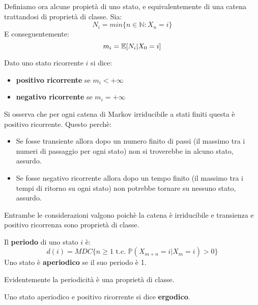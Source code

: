 Definiamo ora alcune propietà di uno stato, e equivalentemente di una catena trattandosi di proprietà di classe. Sia:
\[N_i=min\{n\in\mathbb{N}:X_n=i\}\]
E conseguentemente:
\[m_i=\mathbb{E}[N_i|X_0=i]\]
\begin{definition}
Dato uno stato ricorrente $i$ si dice:
\begin{itemize}
    \item \textbf{positivo ricorrente} se $m_i < +\infty$
    \item \textbf{negativo ricorrente} se $m_i = +\infty$
\end{itemize}
\end{definition}
Si osserva che per ogni catena di Markov irriducibile a stati finiti questa è positivo ricorrente. Questo perchè:
\begin{itemize}
    \item Se fosse transiente allora dopo un numero finito di passi (il massimo tra i numeri di passaggio per ogni stato) non si troverebbe in alcuno stato, assurdo.
    \item Se fosse negativo ricorrente allora dopo un tempo finito (il massimo tra i tempi di ritorno su ogni stato) non potrebbe tornare su nessuno stato, assurdo.
\end{itemize}
Entrambe le considerazioni valgono poichè la catena è irriducibile e transienza e positivo ricorrenza sono proprietà di classe. 
\begin{definition}
Il \textbf{periodo} di uno stato $i$ è: \[d(i)=MDC\{n\geq 1 \text{  t.c.  } \mathbb{P}(X_{m+n}=i|X_m=i)>0\}\]
Uno stato è \textbf{aperiodico} se il suo periodo è 1.
\end{definition}
Evidentemente la periodicità è una proprietà di classe.
\begin{definition}
Uno stato aperiodico e positivo ricorrente si dice \textbf{ergodico}.
\end{definition}

